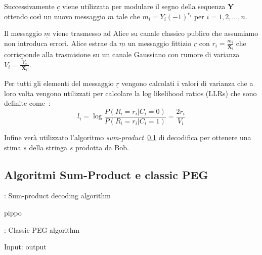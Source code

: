 Successivamente $\underline{c}$ viene utilizzata per modulare il segno della sequenza $\textbf{Y}$ ottendo cos\`i un nuovo messaggio $\underline{m}$ tale che $m_i = Y_i(-1)^{c_i}$ per $i = 1,2,\dots,n$.

Il messaggio $\underline{m}$ viene trasmesso ad Alice su canale classico publico che assumiamo non introduca errori. Alice estrae da $\underline{m}$ un messaggio fittizio $\underline{r}$ con $r_i = \frac{m_i}{\textbf{X}_i}$ che corrisponde alla trasmisione su un canale Gaussiano con rumore di varianza $V_i = \frac{V_z}{|\textbf{X}_i|}$. 

Per tutti gli elementi del messaggio $\underline{r}$ vengono calcolati i valori di varianza che a loro volta vengono utilizzati per calcolare la log likelihood ratios (LLRs) che sono definite come~\cite{gumucs2021novel}:
\begin{equation}
l_i = \log \frac{P(R_i = r_i| C_i = 0)}{P(R_i = r_i| C_i = 1)} = \frac{2r_i}{V_i}
\end{equation}

Infine ver\`a utilizzato l'algoritmo \textit{sum-product}~\ref{subse:algorithms} di decodifica per ottenere una stima ${\underline{s}}$ della stringa $\underline s$ prodotta da Bob.

\subsection{Algoritmi Sum-Product e classic PEG}\label{subse:algorithms}

\begin{algorithm}
\caption{: Sum-product decoding algorithm}
\begin{algorithmic}
\STATE pippo
\end{algorithmic}
\end{algorithm}


\begin{algorithm}
\caption{: Classic PEG algorithm}
\begin{algorithmic}
\STATE Input:  \STATE output
\end{algorithmic}
\end{algorithm}






